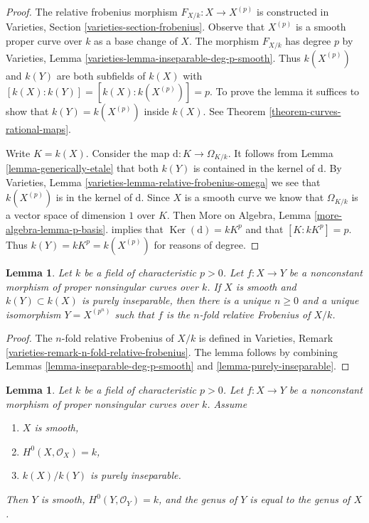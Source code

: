 \documentclass{stacks-project}
\theoremstyle{plain}
\newtheorem{lemma}[subsection]{Lemma}
\theoremstyle{definition}
\theoremstyle{remark}
\numberwithin{equation}{subsection}
\def\Ker{\mathop{\mathrm{Ker}}}
\begin{document}
\begin{proof}
The relative frobenius morphism $F_{X/k} : X \to X^{(p)}$
is constructed in Varieties, Section \ref{varieties-section-frobenius}.
Observe that $X^{(p)}$ is a smooth proper curve over $k$
as a base change of $X$. The morphism $F_{X/k}$ has degree $p$ by
Varieties, Lemma \ref{varieties-lemma-inseparable-deg-p-smooth}.
Thus $k(X^{(p)})$ and $k(Y)$ are both subfields of $k(X)$
with $[k(X) : k(Y)] = [k(X) : k(X^{(p)})] = p$. To prove the lemma
it suffices to show that $k(Y) = k(X^{(p)})$ inside $k(X)$. See
Theorem \ref{theorem-curves-rational-maps}.

\medskip\noindent
Write $K = k(X)$. Consider the map $\text{d} : K \to \Omega_{K/k}$.
It follows from Lemma \ref{lemma-generically-etale}
that both $k(Y)$ is contained in the
kernel of $\text{d}$. By
Varieties, Lemma \ref{varieties-lemma-relative-frobenius-omega}
we see that $k(X^{(p)})$ is in the kernel of $\text{d}$.
Since $X$ is a smooth curve we know that $\Omega_{K/k}$
is a vector space of dimension $1$ over $K$.
Then More on Algebra, Lemma \ref{more-algebra-lemma-p-basis}.
implies that $\Ker(\text{d}) = kK^p$ and
that $[K : kK^p] = p$.
Thus $k(Y) = kK^p = k(X^{(p)})$ for reasons of degree.
\end{proof}

\begin{lemma}
\label{lemma-purely-inseparable-smooth}
Let $k$ be a field of characteristic $p > 0$. Let $f : X \to Y$ be a
nonconstant morphism of proper nonsingular curves over $k$.
If $X$ is smooth and $k(Y) \subset k(X)$ is purely inseparable,
then there is a unique $n \geq 0$ and a unique isomorphism $Y = X^{(p^n)}$
such that $f$ is the $n$-fold relative Frobenius of $X/k$.
\end{lemma}

\begin{proof}
The $n$-fold relative Frobenius of $X/k$ is defined in
Varieties, Remark \ref{varieties-remark-n-fold-relative-frobenius}.
The lemma follows by combining Lemmas \ref{lemma-inseparable-deg-p-smooth}
and \ref{lemma-purely-inseparable}.
\end{proof}

\begin{lemma}
\label{lemma-purely-inseparable-smooth-genus}
Let $k$ be a field of characteristic $p > 0$. Let $f : X \to Y$ be a
nonconstant morphism of proper nonsingular curves over $k$.
Assume
\begin{enumerate}
\item $X$ is smooth,
\item $H^0(X, \mathcal{O}_X) = k$,
\item $k(X)/k(Y)$ is purely inseparable.
\end{enumerate}
Then $Y$ is smooth, $H^0(Y, \mathcal{O}_Y) = k$, and the genus of $Y$
is equal to the genus of $X$.
\end{lemma}
\end{document}
